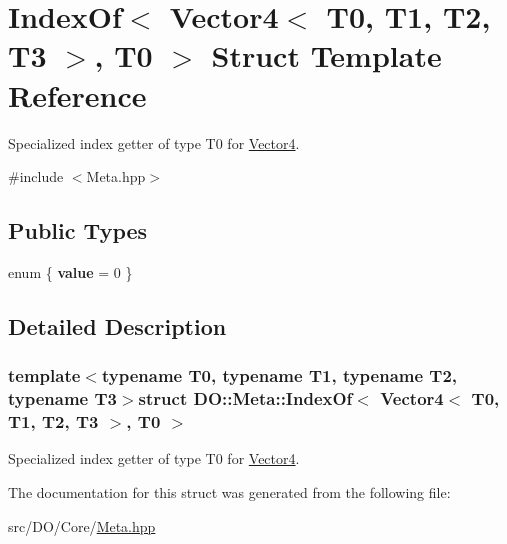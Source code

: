 \hypertarget{struct_d_o_1_1_meta_1_1_index_of_3_01_vector4_3_01_t0_00_01_t1_00_01_t2_00_01_t3_01_4_00_01_t0_01_4}{\section{Index\-Of$<$ Vector4$<$ T0, T1, T2, T3 $>$, T0 $>$ Struct Template Reference}
\label{struct_d_o_1_1_meta_1_1_index_of_3_01_vector4_3_01_t0_00_01_t1_00_01_t2_00_01_t3_01_4_00_01_t0_01_4}
}


Specialized index getter of type T0 for \hyperlink{struct_d_o_1_1_meta_1_1_vector4}{Vector4}.  




{\ttfamily \#include $<$Meta.\-hpp$>$}

\subsection*{Public Types}
\begin{DoxyCompactItemize}
\item 
enum \{ {\bfseries value} = 0
 \}
\end{DoxyCompactItemize}


\subsection{Detailed Description}
\subsubsection*{template$<$typename T0, typename T1, typename T2, typename T3$>$struct D\-O\-::\-Meta\-::\-Index\-Of$<$ Vector4$<$ T0, T1, T2, T3 $>$, T0 $>$}

Specialized index getter of type T0 for \hyperlink{struct_d_o_1_1_meta_1_1_vector4}{Vector4}. 

The documentation for this struct was generated from the following file\-:\begin{DoxyCompactItemize}
\item 
src/\-D\-O/\-Core/\hyperlink{_meta_8hpp}{Meta.\-hpp}\end{DoxyCompactItemize}
